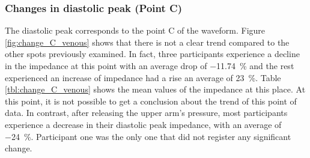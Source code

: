 \subsubsection{Changes in diastolic peak (Point C)}
\label{section5.3.1.3}
The diastolic peak corresponds to the point C of the waveform. Figure \ref{fig:change_C_venous} shows that there is not a clear trend compared to the other spots previously examined. In fact, three participants experience a decline in the impedance at this point with an average drop of \SI{-11.74}{\percent} and the rest experienced an increase of impedance had a rise an average of \SI{23}{\percent}. Table \ref{tbl:change_C_venous} shows the mean values of the impedance at this place. At this point, it is not possible to get a conclusion about the trend of this point of data. In contrast, after releasing the upper arm's pressure, most participants experience a decrease in their diastolic peak impedance, with an average of \SI{-24}{\percent}. Participant one was the only one that did not register any significant change. 

